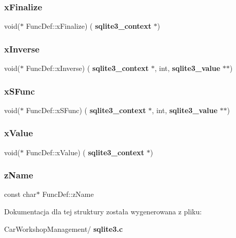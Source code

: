 \mbox{\label{struct_func_def_a2315fa9b1a173dca2ba0c506548b83f9}} 
\subsubsection{xFinalize}
{\footnotesize\ttfamily void($\ast$ Func\+Def\+::x\+Finalize) (\textbf{ sqlite3\+\_\+context} $\ast$)}

\mbox{\label{struct_func_def_adef971bf88f45c30aced6b3df200932b}} 
\subsubsection{xInverse}
{\footnotesize\ttfamily void($\ast$ Func\+Def\+::x\+Inverse) (\textbf{ sqlite3\+\_\+context} $\ast$, int, \textbf{ sqlite3\+\_\+value} $\ast$$\ast$)}

\mbox{\label{struct_func_def_a64986fd7c3b2a3715f5e7a54c0ef385e}} 
\subsubsection{xSFunc}
{\footnotesize\ttfamily void($\ast$ Func\+Def\+::x\+S\+Func) (\textbf{ sqlite3\+\_\+context} $\ast$, int, \textbf{ sqlite3\+\_\+value} $\ast$$\ast$)}

\mbox{\label{struct_func_def_ac46d38936cac56c5c19d1dc68ce245e8}} 
\subsubsection{xValue}
{\footnotesize\ttfamily void($\ast$ Func\+Def\+::x\+Value) (\textbf{ sqlite3\+\_\+context} $\ast$)}

\mbox{\label{struct_func_def_ac732c25b31e5c5a5390db76e74724024}} 
\subsubsection{zName}
{\footnotesize\ttfamily const char$\ast$ Func\+Def\+::z\+Name}



Dokumentacja dla tej struktury została wygenerowana z pliku\+:\begin{DoxyCompactItemize}
\item 
Car\+Workshop\+Management/\textbf{ sqlite3.\+c}\end{DoxyCompactItemize}
